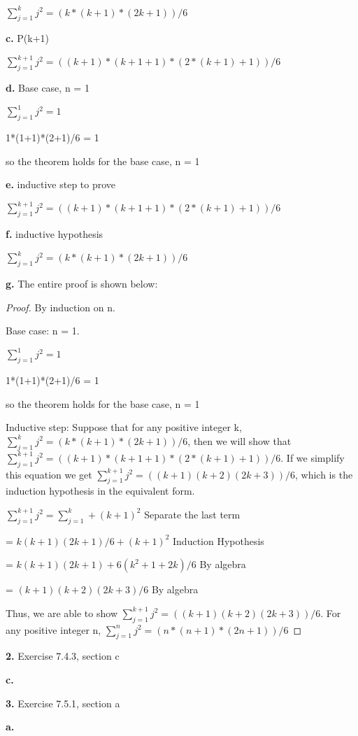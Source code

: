\documentclass[11pt]{article}
\begin{document}
	$\sum_{j=1}^{k} j^2=(k*(k+1)*(2k+1))/6$
	
	\textbf{c.}
	P(k+1)
	
	$\sum_{j=1}^{k+1} j^2=((k+1)*(k+1+1)*(2*(k+1)+1))/6$
	
	\textbf{d.}
	Base case, n = 1
	
	$\sum_{j=1}^{1} j^2=1$
	
	1*(1+1)*(2+1)/6 = 1
	
	so the theorem holds for the base case, n = 1
	
	\textbf{e.}
	inductive step to prove
	
	$\sum_{j=1}^{k+1} j^2=((k+1)*(k+1+1)*(2*(k+1)+1))/6$
	
	\textbf{f.}
	inductive hypothesis
	
	$\sum_{j=1}^{k} j^2=(k*(k+1)*(2k+1))/6$
	
	\textbf{g.}
	The entire proof is shown below:
	\begin{proof}
	By induction on n.
	
	Base case: n = 1.
	
	$\sum_{j=1}^{1} j^2=1$
	
	1*(1+1)*(2+1)/6 = 1
	
	so the theorem holds for the base case, n = 1
	
	Inductive step: Suppose that for any positive integer k, $\sum_{j=1}^{k} j^2=(k*(k+1)*(2k+1))/6$, then we will show that $\sum_{j=1}^{k+1} j^2=((k+1)*(k+1+1)*(2*(k+1)+1))/6$. If we simplify this equation we get $\sum_{j=1}^{k+1} j^2=((k+1)(k+2)(2k+3))/6$, which is the induction hypothesis in the equivalent form.
	
	$\sum_{j=1}^{k+1} j^2=\sum_{j=1}^{k}+(k+1)^2$ Separate the last term

\hspace{13.5mm}	= $k(k+1)(2k+1)/6+(k+1)^2$ Induction Hypothesis

\hspace{13.5mm}	= $k(k+1)(2k+1)+6(k^2+1+2k)/6$ By algebra

\hspace{13.5mm}	= $(k+1)(k+2)(2k+3)/6$ By algebra

    Thus, we are able to show $\sum_{j=1}^{k+1} j^2=((k+1)(k+2)(2k+3))/6$. For any positive integer n, $\sum_{j=1}^{n} j^2=(n*(n+1)*(2n+1))/6$ 
	
	\end{proof}
	
	\vspace{20mm}
	\textbf{2. }Exercise 7.4.3, section c
	
	\textbf{c.}
	
	
	
	\vspace{20mm}
	\textbf{3.} Exercise 7.5.1, section a
	
	\textbf{a.}

	
	
\end{document}
